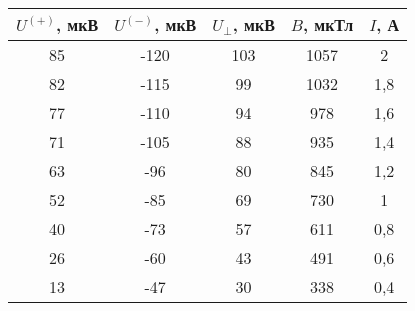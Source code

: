 \begin{table}[h!]
    \begin{center}
        \begin{tabular}{|c|c|c|c|c|}
            \hline
            $U^{(+)}$, мкВ & $U^{(-)}$, мкВ & $U_{\bot}$, мкВ & $B$, мкТл & $I$, А \\ \hline
            85             & -120           & 103             & 1057      & 2      \\ \hline
            82             & -115           & 99              & 1032      & 1,8    \\ \hline
            77             & -110           & 94              & 978       & 1,6    \\ \hline
            71             & -105           & 88              & 935       & 1,4    \\ \hline
            63             & -96            & 80              & 845       & 1,2    \\ \hline
            52             & -85            & 69              & 730       & 1      \\ \hline
            40             & -73            & 57              & 611       & 0,8    \\ \hline
            26             & -60            & 43              & 491       & 0,6    \\ \hline
            13             & -47            & 30              & 338       & 0,4    \\ \hline
        \end{tabular}
    \end{center}
    \caption{}
\end{table}